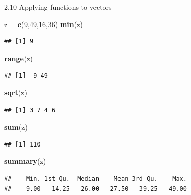 \documentclass[
  ignorenonframetext,
]{beamer}
\newenvironment{Shaded}{\begin{snugshade}}{\end{snugshade}}
\newcommand{\DecValTok}[1]{\textcolor[rgb]{0.00,0.00,0.81}{#1}}
\newcommand{\FunctionTok}[1]{\textcolor[rgb]{0.13,0.29,0.53}{\textbf{#1}}}
\newcommand{\NormalTok}[1]{#1}
\newcommand{\OtherTok}[1]{\textcolor[rgb]{0.56,0.35,0.01}{#1}}
\begin{document}
\begin{frame}[fragile]{2.10 Applying functions to vectors}
\protect\hypertarget{applying-functions-to-vectors}{}
\begin{Shaded}
\begin{Highlighting}[]
\NormalTok{z }\OtherTok{=} \FunctionTok{c}\NormalTok{(}\DecValTok{9}\NormalTok{,}\DecValTok{49}\NormalTok{,}\DecValTok{16}\NormalTok{,}\DecValTok{36}\NormalTok{)}
\FunctionTok{min}\NormalTok{(z)}
\end{Highlighting}
\end{Shaded}

\begin{verbatim}
## [1] 9
\end{verbatim}

\begin{Shaded}
\begin{Highlighting}[]
\FunctionTok{range}\NormalTok{(z)}
\end{Highlighting}
\end{Shaded}

\begin{verbatim}
## [1]  9 49
\end{verbatim}

\begin{Shaded}
\begin{Highlighting}[]
\FunctionTok{sqrt}\NormalTok{(z)}
\end{Highlighting}
\end{Shaded}

\begin{verbatim}
## [1] 3 7 4 6
\end{verbatim}

\begin{Shaded}
\begin{Highlighting}[]
\FunctionTok{sum}\NormalTok{(z)}
\end{Highlighting}
\end{Shaded}

\begin{verbatim}
## [1] 110
\end{verbatim}

\begin{Shaded}
\begin{Highlighting}[]
\FunctionTok{summary}\NormalTok{(z)}
\end{Highlighting}
\end{Shaded}

\begin{verbatim}
##    Min. 1st Qu.  Median    Mean 3rd Qu.    Max. 
##    9.00   14.25   26.00   27.50   39.25   49.00
\end{verbatim}
\end{frame}
\end{document}
